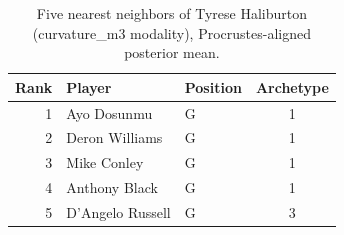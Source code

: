 \begin{table}[htbp]
  \centering\small
  \begin{tabular}{rllc}
    \toprule
    Rank & Player & Position & Archetype \\
    \midrule
    1 & Ayo Dosunmu & G & 1 \\
    2 & Deron Williams & G & 1 \\
    3 & Mike Conley & G & 1 \\
    4 & Anthony Black & G & 1 \\
    5 & D'Angelo Russell & G & 3 \\
    \bottomrule
  \end{tabular}
  \caption{Five nearest neighbors of Tyrese Haliburton (curvature_m3 modality), Procrustes-aligned posterior mean.}
  \label{tab:Tyrese_Haliburton_neighbors_curvature_m3}
\end{table}

